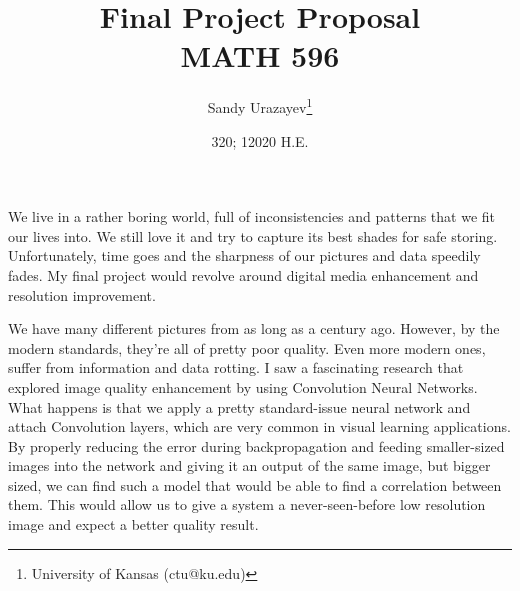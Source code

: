 \documentclass[12pt]{article}
\author{Sandy Urazayev\thanks{University of Kansas (ctu@ku.edu)}}
\date{320; 12020 H.E.}
\title{Final Project Proposal\\\medskip
\large MATH 596}
\begin{document}
\maketitle
We live in a rather boring world, full of inconsistencies and patterns that we
fit our lives into. We still love it and try to capture its best shades for safe
storing. Unfortunately, time goes and the sharpness of our pictures and data
speedily fades. My final project would revolve around digital media enhancement
and resolution improvement. 

We have many different pictures from as long as a century ago. However, by the
modern standards, they're all of pretty poor quality. Even more modern ones,
suffer from information and data rotting. I saw a fascinating research that
explored image quality enhancement by using Convolution Neural
Networks. \cite{shi2016realtime} What happens is that we apply a pretty
standard-issue neural network and attach Convolution layers, which are very
common in visual learning applications. By properly reducing the error during
backpropagation and feeding smaller-sized images into the network and giving it
an output of the same image, but bigger sized, we can find such a model that
would be able to find a correlation between them. This would allow us to give a
system a never-seen-before low resolution image and expect a better quality
result. 



\end{document}
